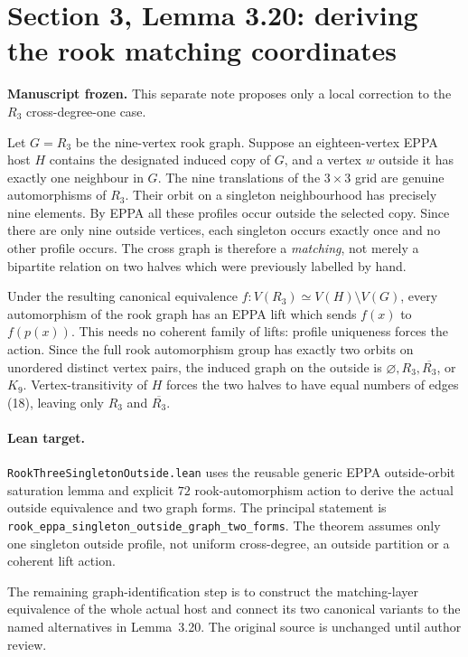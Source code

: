 \documentclass[11pt]{article}
\begin{document}
\section*{Section 3, Lemma 3.20: deriving the rook matching coordinates}
\textbf{Manuscript frozen.} This separate note proposes only
a local correction to the \(R_3\) cross-degree-one case.

Let \(G=R_3\) be the nine-vertex rook graph. Suppose an
eighteen-vertex EPPA host \(H\) contains the designated
induced copy of \(G\), and a vertex \(w\) outside it
has exactly one neighbour in \(G\).
The nine translations of the \(3\times3\) grid are
genuine automorphisms of \(R_3\). Their orbit on
a singleton neighbourhood has precisely nine elements.
By EPPA all these profiles occur outside the selected
copy. Since there are only nine outside vertices,
each singleton occurs exactly once and no other profile
occurs. The cross graph is therefore a \emph{matching},
not merely a bipartite relation on two halves
which were previously labelled by hand.

Under the resulting canonical equivalence
\(f:V(R_3)\simeq V(H)\setminus V(G)\), every
automorphism of the rook graph has an EPPA lift
which sends \(f(x)\) to \(f(p(x))\).
This needs no coherent family of lifts:
profile uniqueness forces the action.
Since the full rook automorphism group has exactly
two orbits on unordered distinct vertex pairs,
the induced graph on the outside is
\(\varnothing,R_3,\overline{R_3}\), or \(K_9\).
Vertex-transitivity of \(H\) forces the two halves
to have equal numbers of edges (18), leaving only
\(R_3\) and \(\overline{R_3}\).

\paragraph{Lean target.}
\texttt{RookThreeSingletonOutside.lean} uses the
reusable generic EPPA outside-orbit saturation lemma
and explicit \(72\) rook-automorphism action to derive
the actual outside equivalence and two graph forms.
The principal statement is
\texttt{rook\_eppa\_singleton\_outside\_graph\_two\_forms}.
The theorem assumes only one singleton outside profile,
not uniform cross-degree, an outside partition or a
coherent lift action.

The remaining graph-identification step is to construct
the matching-layer equivalence of the whole actual host
and connect its two canonical variants to the named
alternatives in Lemma~3.20.
The original source is unchanged until author review.
\end{document}
